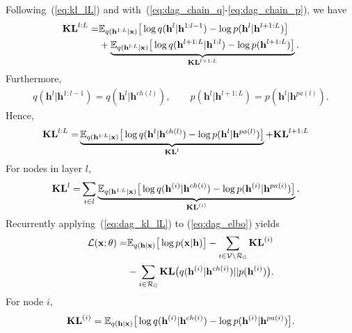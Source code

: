 \documentclass[sigconf, anonymous, review]{acmart}
\theoremstyle{plain}
\theoremstyle{definition}
\theoremstyle{remark}
\begin{document}
Following~(\ref{eq:kl_lL}) and with~(\ref{eq:dag_chain_q}-\ref{eq:dag_chain_p}), we have 
 \begin{align} \notag
\textbf{\text{KL}}^{l:L} 
=&  \mathbb{E}_{q(\mathbf{h}^{1:L}|\mathbf{x})}\big[  \log q(\mathbf{h}^{l}|\mathbf{h}^{1:l-1})   - \log p(\mathbf{h}^{l}|\mathbf{h}^{l+1:L}) \big] \\ \notag
&+ \underbrace{\mathbb{E}_{q(\mathbf{h}^{l:L}|\mathbf{x})}\big[  \log q(\mathbf{h}^{l+1:L}|\mathbf{h}^{1:l})- \log p(\mathbf{h}^{l+1:L})  \big]}_{\mathbf{KL}^{l+1:L}}.
\end{align} %
Furthermore,
\begin{align*} 
q(\mathbf{h}^{l}|\mathbf{h}^{1:l-1})=q(\mathbf{h}^{l}|\mathbf{h}^{ch(l)}), \quad  \quad   p(\mathbf{h}^{l}|\mathbf{h}^{l+1:L}) = p(\mathbf{h}^{l}|\mathbf{h}^{pa(l)}).
\end{align*} %
Hence,
 \begin{align} \label{eq:dag_kl_lL}
\textbf{\text{KL}}^{l:L} 
=&  \underbrace{\mathbb{E}_{q(\mathbf{h}^{1:L}|\mathbf{x})}\big[ \log q(\mathbf{h}^{l}|\mathbf{h}^{ch(l)})  - \log p(\mathbf{h}^{l}|\mathbf{h}^{pa(l)}) \big]}_{\textbf{\text{KL}}^{l}} +\textbf{\text{KL}}^{l+1:L} 
\end{align} %
For nodes in layer $l$,
\begin{align} \notag
\textbf{\text{KL}}^{l} =& \sum_{i \in l} \underbrace{\mathbb{E}_{q(\mathbf{h}^{1:L}|\mathbf{x})}\big[  \log q(\mathbf{h}^{(i)}|\mathbf{h}^{ch(i)})  - \log p(\mathbf{h}^{(i)}|\mathbf{h}^{pa(i)}) \big]}_{\textbf{\text{KL}}^{(i)}} .
\end{align}
Recurrently applying~(\ref{eq:dag_kl_lL}) to (\ref{eq:dag_elbo}) yields
\begin{align}\notag %
\mathcal{L}(\mathbf{x}; \theta) =& \mathbb{E}_{q(\mathbf{h}|\mathbf{x})}\big[ \log p(\mathbf{x}|\mathbf{h})  \big] -  \sum_{i \in \mathcal{V}  \setminus  \mathcal{R}_{ \mathbb{G} }} \textbf{\text{KL}}^{(i)} \\ \notag
&-    \sum_{i \in  \mathcal{R}_{ \mathbb{G} }  }  \textbf{\text{KL}}\big(q(\mathbf{h}^{(i)} | \mathbf{h}^{ch(i)} )   || p(\mathbf{h}^{(i)})  \big) .
\end{align} %
For node $i$, 
$$\textbf{\text{KL}}^{(i)} = \mathbb{E}_{q(\mathbf{h}|\mathbf{x})}\big[  \log q(\mathbf{h}^{(i)}|\mathbf{h}^{ch(i)})  - \log p(\mathbf{h}^{(i)}|\mathbf{h}^{pa(i)}) \big].$$
\end{document}
